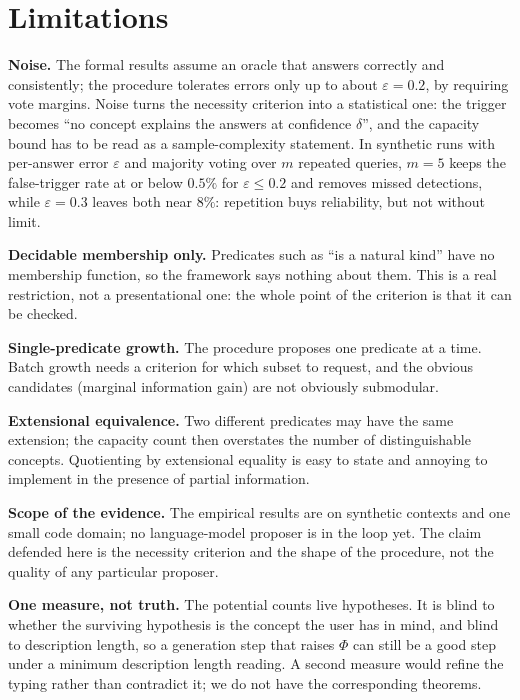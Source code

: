 \documentclass[11pt]{article}
\begin{document}
\section{Limitations}

\textbf{Noise.} The formal results assume an oracle that answers correctly and consistently; the
procedure tolerates errors only up to about $\varepsilon = 0.2$, by requiring vote margins. Noise
turns the necessity criterion into a statistical one: the trigger becomes ``no concept explains the
answers at confidence $\delta$'', and the capacity bound has to be read as a sample-complexity
statement. In synthetic runs with per-answer error $\varepsilon$ and majority voting over $m$
repeated queries, $m=5$ keeps the false-trigger rate at or below $0.5\%$ for $\varepsilon \le 0.2$
and removes missed detections, while $\varepsilon = 0.3$ leaves both near $8\%$: repetition buys
reliability, but not without limit.

\textbf{Decidable membership only.} Predicates such as ``is a natural kind'' have no membership
function, so the framework says nothing about them. This is a real restriction, not a presentational
one: the whole point of the criterion is that it can be checked.

\textbf{Single-predicate growth.} The procedure proposes one predicate at a time. Batch growth needs
a criterion for which subset to request, and the obvious candidates (marginal information gain) are
not obviously submodular.

\textbf{Extensional equivalence.} Two different predicates may have the same extension; the capacity
count then overstates the number of distinguishable concepts. Quotienting by extensional equality is
easy to state and annoying to implement in the presence of partial information.

\textbf{Scope of the evidence.} The empirical results are on synthetic contexts and one small code
domain; no language-model proposer is in the loop yet. The claim defended here is the necessity
criterion and the shape of the procedure, not the quality of any particular proposer.

\textbf{One measure, not truth.} The potential counts live hypotheses. It is blind to whether the
surviving hypothesis is the concept the user has in mind, and blind to description length, so a
generation step that raises $\Phi$ can still be a good step under a minimum description length reading. A second measure
would refine the typing rather than contradict it; we do not have the corresponding theorems.
\end{document}

